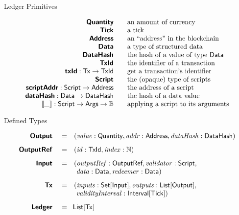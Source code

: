 \newcommand\bs[1]{\mbox{\textbf{\s{#1}}}}
\begin{frame}{Ledger Primitives}

\begin{displaymath}
\begin{array}{rll}
  \bs{Quantity} && \mbox{an amount of currency}\\
  \bs{Tick}  && \mbox{a tick}\\
  \bs{Address} && \mbox{an ``address'' in the blockchain}\\
  \bs{Data}  && \mbox{a type of structured data}\\
  \bs{DataHash} && \mbox{the hash of a value of type \Data{}}\\
  \bs{TxId} && \mbox{the identifier of a transaction}\\
  \bs{txId} : \s{Tx} \rightarrow \s{TxId} && \mbox{get a transaction's identifier}\\
  \bs{Script} && \mbox{the (opaque) type of scripts}\\
  \bs{scriptAddr} : \s{Script} \rightarrow \s{Address} && \mbox{the address of a script}\\
  \bs{dataHash} : \s{Data} \rightarrow \s{DataHash} && \mbox{the hash of a data value}\\
  \mathbf{\llbracket \_ \rrbracket} : \script \rightarrow \s{Args} \rightarrow \mathbb{B} && \mbox{applying a script to its arguments}\\
\end{array}
\end{displaymath}

\end{frame}

\begin{frame}{Defined Types}

\begin{displaymath}
\begin{array}{rll}
  \bs{Output }    &=&(\val: \qty, \addr: \Address, \dataHsh: \DataHash)\\[8pt]

  \bs{OutputRef } &=&(\txrefid: \TxId, \idx: \N)\\[8pt]

  \bs{Input }     &=&(\outputref: \s{OutputRef}, \validator: \script,\\
                  & &\ \dataVal: \Data, \redeemerVal: \Data)\\[8pt]

  \bs{Tx }        &=&(\inputs: \Set{\s{Input}}, \outputs: \List{\s{Output}},\\
                  & &\ \validityInterval: \Interval{\tick})\\[8pt]

  \bs{Ledger }    &=&\!\List{\eutxotx}\\
\end{array}
\end{displaymath}

\end{frame}

